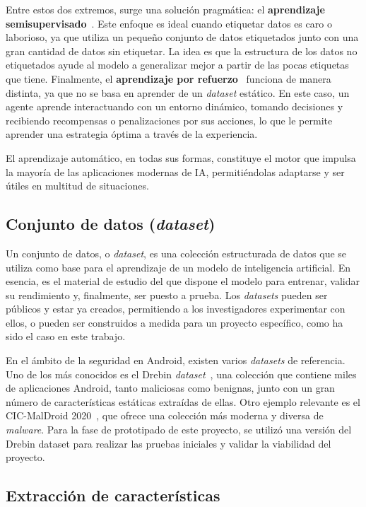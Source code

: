 Entre estos dos extremos, surge una solución pragmática: el \textbf{aprendizaje semisupervisado}~\cite{van2020survey}. Este enfoque es ideal cuando etiquetar datos es caro o laborioso, ya que utiliza un pequeño conjunto de datos etiquetados junto con una gran cantidad de datos sin etiquetar. La idea es que la estructura de los datos no etiquetados ayude al modelo a generalizar mejor a partir de las pocas etiquetas que tiene. Finalmente, el \textbf{aprendizaje por refuerzo}~\cite{de2018multi} funciona de manera distinta, ya que no se basa en aprender de un \textit{dataset} estático. En este caso, un agente aprende interactuando con un entorno dinámico, tomando decisiones y recibiendo recompensas o penalizaciones por sus acciones, lo que le permite aprender una estrategia óptima a través de la experiencia.

El aprendizaje automático, en todas sus formas, constituye el motor que impulsa la mayoría de las aplicaciones modernas de IA, permitiéndolas adaptarse y ser útiles en multitud de situaciones.

\subsection{Conjunto de datos (\textit{dataset})}

Un conjunto de datos, o \textit{dataset}, es una colección estructurada de datos que se utiliza como base para el aprendizaje de un modelo de inteligencia artificial. En esencia, es el material de estudio del que dispone el modelo para entrenar, validar su rendimiento y, finalmente, ser puesto a prueba. Los \textit{datasets} pueden ser públicos y estar ya creados, permitiendo a los investigadores experimentar con ellos, o pueden ser construidos a medida para un proyecto específico, como ha sido el caso en este trabajo.

En el ámbito de la seguridad en Android, existen varios \textit{datasets} de referencia. Uno de los más conocidos es el Drebin \textit{dataset}~\cite{arp2014drebin}, una colección que contiene miles de aplicaciones Android, tanto maliciosas como benignas, junto con un gran número de características estáticas extraídas de ellas. Otro ejemplo relevante es el CIC-MalDroid 2020~\cite{mahdavifar2020dynamic}, que ofrece una colección más moderna y diversa de \textit{malware}. Para la fase de prototipado de este proyecto, se utilizó una versión del Drebin dataset para realizar las pruebas iniciales y validar la viabilidad del proyecto.

\subsection{Extracción de características}

